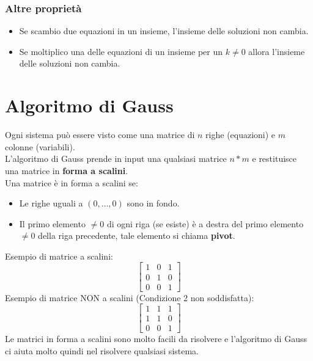 \documentclass[12pt,a4paper]{article}
\let\oldsection\section
\renewcommand{\section}{\clearpage\oldsection}
\begin{document}
\subsubsection{Altre proprietà}
\begin{itemize}
  \item Se scambio due equazioni in un insieme, l'insieme delle soluzioni non cambia.
  \item Se moltiplico una delle equazioni di un insieme per un $k \ne 0$ allora l'insieme delle soluzioni non cambia.
\end{itemize}
\section{Algoritmo di Gauss}
Ogni sistema può essere visto come una matrice di $n$ righe (equazioni) e $m$ colonne (variabili).\\
L'algoritmo di Gauss prende in input una qualsiasi matrice $n * m$ e restituisce una matrice in \textbf{forma a scalini}.\\
Una matrice è in forma a scalini se:
\begin{itemize}
  \item Le righe uguali a $(0,\ldots,0)$ sono in fondo.
  \item Il primo elemento $\ne 0$ di ogni riga (se esiste) è a destra del primo elemento $\ne 0$ della riga precedente, tale elemento si chiama \textbf{pivot}.
\end{itemize}
Esempio di matrice a scalini:
\[
\begin{bmatrix}
1 & 0 & 1 \\
0 & 1 & 0 \\
0 & 0 & 1
\end{bmatrix}
\]
Esempio di matrice NON a scalini (Condizione 2 non soddisfatta):
\[
\begin{bmatrix}
1 & 1 & 1 \\
1 & 1 & 0 \\
0 & 0 & 1
\end{bmatrix}
\]
Le matrici in forma a scalini sono molto facili da risolvere e l'algoritmo di Gauss ci aiuta molto quindi nel risolvere qualsiasi sistema.
\end{document}
